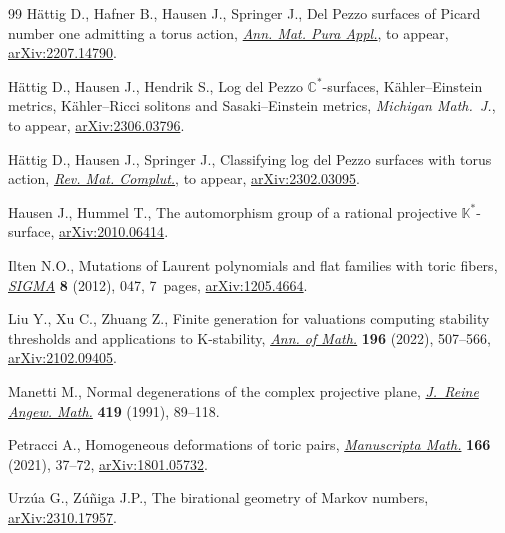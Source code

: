 \begin{thebibliography}{99}
H\"attig D., Hafner B., Hausen J., Springer J., Del {P}ezzo surfaces of
 {P}icard number one admitting a torus action,
 \href{https://doi.org/10.1007/s10231-025-01552-5}{\textit{Ann. Mat. Pura
 Appl.}}, {t}o appear,
 \href{http://arxiv.org/abs/2207.14790}{arXiv:2207.14790}.

H\"attig D., Hausen J., Hendrik S., Log del Pezzo $\mathbb{C}^*$-surfaces,
 {K}\"ahler--{E}instein metrics, {K}\"ahler--{R}icci solitons and
 {S}asaki--{E}instein metrics, \textit{Michigan Math.~J.}, {t}o appear,
 \href{http://arxiv.org/abs/2306.03796}{arXiv:2306.03796}.

H\"attig D., Hausen J., Springer J., Classifying log del {P}ezzo surfaces with
 torus action, \href{https://doi.org/10.1007/s13163-025-00526-8}{\textit{Rev.
 Mat. Complut.}}, {t}o appear,
 \href{http://arxiv.org/abs/2302.03095}{arXiv:2302.03095}.

Hausen J., Hummel T., The automorphism group of a rational projective
 {$\mathbb{K}^*$}-surface,
 \href{http://arxiv.org/abs/2010.06414}{arXiv:2010.06414}.

Ilten N.O., Mutations of {L}aurent polynomials and flat families with toric
 fibers, \href{https://doi.org/10.3842/SIGMA.2012.047}{\textit{SIGMA}}
 \textbf{8} (2012), 047, 7~pages,
 \href{http://arxiv.org/abs/1205.4664}{arXiv:1205.4664}.

Liu Y., Xu C., Zhuang Z., Finite generation for valuations computing stability
 thresholds and applications to {K}-stability,
 \href{https://doi.org/10.4007/annals.2022.196.2.2}{\textit{Ann. of Math.}}
 \textbf{196} (2022), 507--566,
 \href{http://arxiv.org/abs/2102.09405}{arXiv:2102.09405}.

Manetti M., Normal degenerations of the complex projective plane,
 \href{https://doi.org/10.1515/crll.1991.419.89}{\textit{J.~Reine Angew.
 Math.}} \textbf{419} (1991), 89--118.

Petracci A., Homogeneous deformations of toric pairs,
 \href{https://doi.org/10.1007/s00229-020-01219-w}{\textit{Manuscripta Math.}}
 \textbf{166} (2021), 37--72,
 \href{http://arxiv.org/abs/1801.05732}{arXiv:1801.05732}.

Urz\'ua G., Z\'u\~niga J.P., The birational geometry of {M}arkov numbers,
 \href{http://arxiv.org/abs/2310.17957}{arXiv:2310.17957}.

\end{thebibliography}
